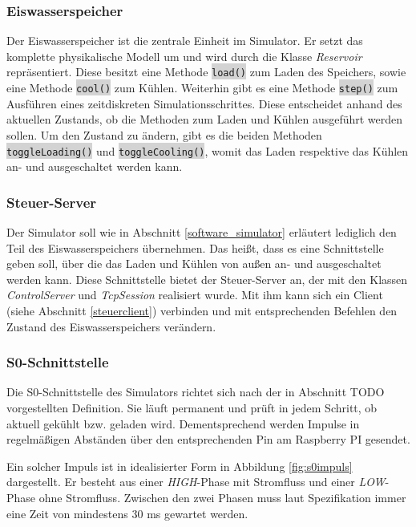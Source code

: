 \subsubsection{Eiswasserspeicher}
Der Eiswasserspeicher ist die zentrale Einheit im Simulator. Er setzt das komplette physikalische Modell um und wird durch die Klasse \emph{Reservoir} repräsentiert. Diese besitzt eine Methode \colorbox{lightgrey}{\lstinline[basicstyle=\ttfamily]|load()|} zum Laden des Speichers, sowie eine Methode \colorbox{lightgrey}{\lstinline[basicstyle=\ttfamily]|cool()|} zum Kühlen. Weiterhin gibt es eine Methode \colorbox{lightgrey}{\lstinline[basicstyle=\ttfamily]|step()|} zum Ausführen eines zeitdiskreten Simulationsschrittes. Diese entscheidet anhand des aktuellen Zustands, ob die Methoden zum Laden und Kühlen ausgeführt werden sollen. Um den Zustand zu ändern, gibt es die beiden Methoden \colorbox{lightgrey}{\lstinline[basicstyle=\ttfamily]|toggleLoading()|} und \colorbox{lightgrey}{\lstinline[basicstyle=\ttfamily]|toggleCooling()|}, womit das Laden respektive das Kühlen an- und ausgeschaltet werden kann.

\subsubsection{Steuer-Server}
Der Simulator soll wie in Abschnitt \ref{software_simulator} erläutert lediglich den Teil des Eiswasserspeichers übernehmen. Das heißt, dass es eine Schnittstelle geben soll, über die das Laden und Kühlen von außen an- und ausgeschaltet werden kann. Diese Schnittstelle bietet der Steuer-Server an, der mit den Klassen \emph{ControlServer} und \emph{TcpSession} realisiert wurde. Mit ihm kann sich ein Client (siehe Abschnitt \ref{steuerclient}) verbinden und mit entsprechenden Befehlen den Zustand des Eiswasserspeichers verändern.

\subsubsection{S0-Schnittstelle}
Die S0-Schnittstelle des Simulators richtet sich nach der in Abschnitt TODO vorgestellten Definition. Sie läuft permanent und prüft in jedem Schritt, ob aktuell gekühlt bzw. geladen wird. Dementsprechend werden Impulse in regelmäßigen Abständen über den entsprechenden Pin am Raspberry PI gesendet.

Ein solcher Impuls ist in idealisierter Form in Abbildung \ref{fig:s0impuls} dargestellt. Er besteht aus einer \emph{HIGH}-Phase mit Stromfluss und einer \emph{LOW}-Phase ohne Stromfluss. Zwischen den zwei Phasen muss laut Spezifikation immer eine Zeit von mindestens 30 ms gewartet werden.

